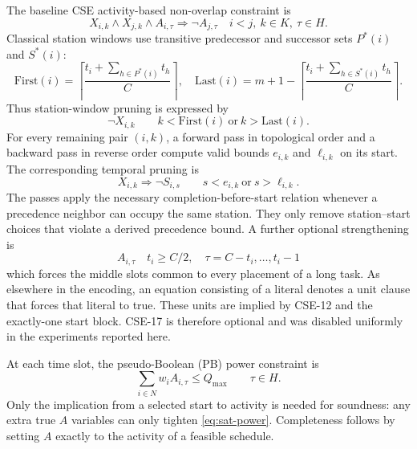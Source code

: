 \documentclass[]{interact}
\theoremstyle{plain}
\theoremstyle{definition}
\theoremstyle{remark}
\newcommand{\Qmax}{Q_{\max}}
\begin{document}
The baseline CSE activity-based non-overlap constraint \citep{VanKieu2025Compact} is
\begin{equation}
X_{i,k}\wedge X_{j,k}\wedge A_{i,\tau}\Rightarrow\neg A_{j,\tau}
\quad i<j,\ k\in K,\ \tau\in H.
\tag{CSE-14}
\label{eq:cse14}
\end{equation}
Classical station windows \citep{Scholl2006} use transitive predecessor and successor sets $P^*(i)$ and $S^*(i)$:
\begin{equation}
\mathrm{First}(i)=\left\lceil\frac{t_i+\sum_{h\in P^*(i)}t_h}{C}\right\rceil,
\quad
\mathrm{Last}(i)=m+1-\left\lceil\frac{t_i+\sum_{h\in S^*(i)}t_h}{C}\right\rceil.
\label{eq:first-last}
\end{equation}
Thus station-window pruning is expressed by
\begin{equation}
\neg X_{i,k}
\qquad k<\mathrm{First}(i)\ \text{or}\ k>\mathrm{Last}(i).
\tag{CSE-15}
\end{equation}
For every remaining pair $(i,k)$, a forward pass in topological order and a backward pass in reverse order compute valid bounds $e_{i,k}$ and $\ell_{i,k}$ on its start. The corresponding temporal pruning is
\begin{equation}
X_{i,k}\Rightarrow\neg S_{i,s}
\qquad s<e_{i,k}\ \text{or}\ s>\ell_{i,k}.
\tag{CSE-16}
\end{equation}
The passes apply the necessary completion-before-start relation whenever a precedence neighbor can occupy the same station. They only remove station--start choices that violate a derived precedence bound. A further optional strengthening is
\begin{equation}
A_{i,\tau}
\quad t_i\geq C/2,\quad \tau=C-t_i,\ldots,t_i-1
\tag{CSE-17}
\end{equation}
which forces the middle slots common to every placement of a long task. As elsewhere in the encoding, an equation consisting of a literal denotes a unit clause that forces that literal to true. These units are implied by CSE-12 and the exactly-one start block. CSE-17 is therefore optional and was disabled uniformly in the experiments reported here.

At each time slot, the pseudo-Boolean (PB) power constraint is
\begin{equation}
\sum_{i\in N}w_iA_{i,\tau}\leq\Qmax
\qquad \tau\in H.
\tag{PPC}
\label{eq:sat-power}
\end{equation}
Only the implication from a selected start to activity is needed for soundness: any extra true $A$ variables can only tighten \eqref{eq:sat-power}. Completeness follows by setting $A$ exactly to the activity of a feasible schedule.
\end{document}
